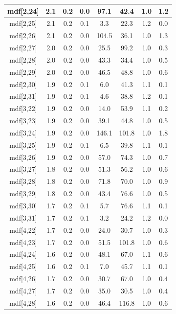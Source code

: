 \begin{longtable}{|c|c|c|c|c|c|c|c|}
\hline
mdf[2,24] & 2.1 & 0.2 & 0.0 & 97.1 & 42.4 & 1.0 & 1.2 \\
\hline
mdf[2,25] & 2.1 & 0.2 & 0.1 & 3.3 & 22.3 & 1.2 & 0.0 \\
\hline
mdf[2,26] & 2.1 & 0.2 & 0.0 & 104.5 & 36.1 & 1.0 & 1.3 \\
\hline
mdf[2,27] & 2.0 & 0.2 & 0.0 & 25.5 & 99.2 & 1.0 & 0.3 \\
\hline
mdf[2,28] & 2.0 & 0.2 & 0.0 & 43.3 & 34.4 & 1.0 & 0.5 \\
\hline
mdf[2,29] & 2.0 & 0.2 & 0.0 & 46.5 & 48.8 & 1.0 & 0.6 \\
\hline
mdf[2,30] & 1.9 & 0.2 & 0.1 & 6.0 & 41.3 & 1.1 & 0.1 \\
\hline
mdf[2,31] & 1.9 & 0.2 & 0.1 & 4.6 & 38.8 & 1.2 & 0.1 \\
\hline
mdf[3,22] & 1.9 & 0.2 & 0.0 & 14.0 & 53.9 & 1.1 & 0.2 \\
\hline
mdf[3,23] & 1.9 & 0.2 & 0.0 & 39.1 & 44.8 & 1.0 & 0.5 \\
\hline
mdf[3,24] & 1.9 & 0.2 & 0.0 & 146.1 & 101.8 & 1.0 & 1.8 \\
\hline
mdf[3,25] & 1.9 & 0.2 & 0.1 & 6.5 & 39.8 & 1.1 & 0.1 \\
\hline
mdf[3,26] & 1.9 & 0.2 & 0.0 & 57.0 & 74.3 & 1.0 & 0.7 \\
\hline
mdf[3,27] & 1.8 & 0.2 & 0.0 & 51.3 & 56.2 & 1.0 & 0.6 \\
\hline
mdf[3,28] & 1.8 & 0.2 & 0.0 & 71.8 & 70.0 & 1.0 & 0.9 \\
\hline
mdf[3,29] & 1.8 & 0.2 & 0.0 & 43.4 & 76.6 & 1.0 & 0.5 \\
\hline
mdf[3,30] & 1.7 & 0.2 & 0.1 & 5.7 & 76.6 & 1.1 & 0.1 \\
\hline
mdf[3,31] & 1.7 & 0.2 & 0.1 & 3.2 & 24.2 & 1.2 & 0.0 \\
\hline
mdf[4,22] & 1.7 & 0.2 & 0.0 & 24.0 & 30.7 & 1.0 & 0.3 \\
\hline
mdf[4,23] & 1.7 & 0.2 & 0.0 & 51.5 & 101.8 & 1.0 & 0.6 \\
\hline
mdf[4,24] & 1.6 & 0.2 & 0.0 & 48.1 & 67.0 & 1.1 & 0.6 \\
\hline
mdf[4,25] & 1.6 & 0.2 & 0.1 & 7.0 & 45.7 & 1.1 & 0.1 \\
\hline
mdf[4,26] & 1.7 & 0.2 & 0.0 & 30.7 & 67.0 & 1.0 & 0.4 \\
\hline
mdf[4,27] & 1.7 & 0.2 & 0.0 & 35.0 & 30.5 & 1.0 & 0.4 \\
\hline
mdf[4,28] & 1.6 & 0.2 & 0.0 & 46.4 & 116.8 & 1.0 & 0.6 \\
\hline

\end{longtable}
